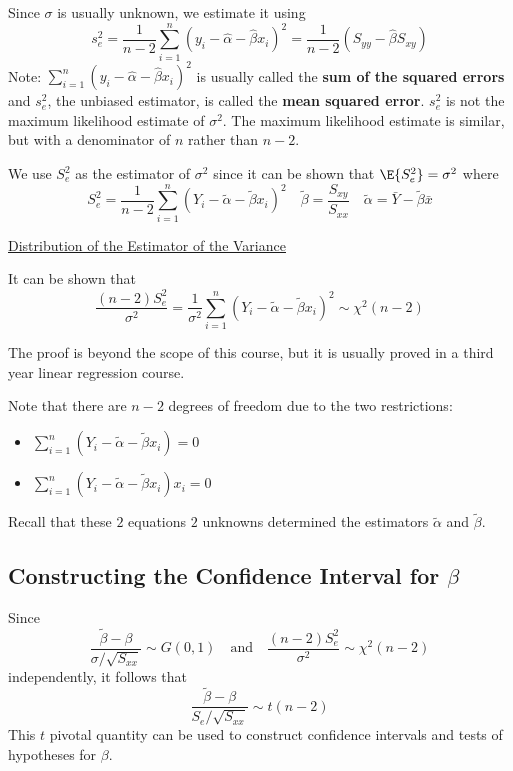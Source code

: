Since $ \sigma $ is usually unknown, we estimate it using
\[s_{e}^{2}=\frac{1}{n-2} \sum_{i=1}^{n}\left(y_{i}-\hat{\alpha}-\hat{\beta} x_{i}\right)^{2}
    =\frac{1}{n-2}\left(S_{y y}-\hat{\beta} S_{x y}\right)\]
Note: $\sum\limits_{i=1}^{n}\left(y_{i}-\hat{\alpha}-\hat{\beta} x_{i}\right)^{2}$ is usually called the
\textbf{sum of the squared errors} and $ s_e^2 $, the unbiased estimator,
is called the \textbf{mean squared error}. $ s_e^2 $ is not the maximum likelihood estimate of
$ \sigma^2 $. The maximum likelihood estimate is similar, but with a denominator of $ n $
rather than $ n-2 $.

We use $ S_e^2 $ as the estimator of $ \sigma^2 $ since it can be shown that
$ \E{S_e^2}=\sigma^2 $ where
\[ S_{e}^{2}=\frac{1}{n-2} \sum_{i=1}^{n}\left(Y_{i}-\tilde{\alpha}-\tilde{\beta} x_{i}\right)^{2}
    \quad \tilde{\beta}=\frac{S_{x y}}{S_{x x}}
    \quad \tilde{\alpha}=\bar{Y}-\tilde{\beta} \bar{x} \]

\underline{Distribution of the Estimator of the Variance}

It can be shown that
\[ \frac{(n-2) S_{e}^{2}}{\sigma^{2}}
    =\frac{1}{\sigma^{2}} \sum_{i=1}^{n}\left(Y_{i}-\tilde{\alpha}-\tilde{\beta} x_{i}\right)^{2}
    \sim \chi^{2}(n-2) \]

The proof is beyond the scope of this course, but it is usually proved in a third year linear
regression course.

Note that there are $ n-2 $ degrees of freedom due to the two restrictions:
\begin{itemize}
    \item $\sum\limits_{i=1}^{n}\left(Y_{i}-\tilde{\alpha}-\tilde{\beta} x_{i}\right)=0$
    \item $\sum\limits_{i=1}^{n}\left(Y_{i}-\tilde{\alpha}-\tilde{\beta} x_{i}\right) x_{i}=0$
\end{itemize}
Recall that these $ 2 $ equations $ 2 $ unknowns determined the estimators
$ \tilde{\alpha} $ and $ \tilde{\beta} $.

\subsection{Constructing the Confidence Interval for $ \beta $}
Since
\[\frac{\tilde{\beta}-\beta}{\sigma / \sqrt{S_{x x}}} \sim G(0,1) \quad \text{and}
    \quad \frac{(n-2) S_{e}^{2}}{\sigma^{2}} \sim \chi^{2}(n-2)\]
independently, it follows that
\[ \frac{\tilde{\beta}-\beta}{S_e / \sqrt{S_{x x}}} \sim t(n-2)\]
This $ t $ pivotal quantity can be used to construct confidence intervals
and tests of hypotheses for $ \beta $.

